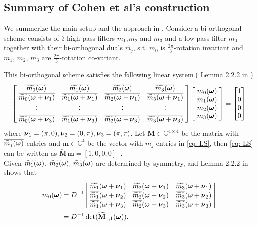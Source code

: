 \subsection{Summary of Cohen et al's construction}\label{subsec: cohen-summary}
We summerize the main setup and the approach in \cite{cohen1993compactly}. Consider a bi-orthogonal scheme consists of 3 high-pass filters $m_1,m_2$ and $m_3$ and a low-pass filter $m_0$ together with their bi-orthogonal duals $\widetilde{m_j}$, s.t.
$m_0$ is $\frac{2\pi}{3}$-rotation invariant and $m_1,\, m_2,\, m_3$ are $\frac{2\pi}{3}$-rotation co-variant.

This bi-orthogonal scheme satisfies the following linear system (
Lemma 2.2.2 in \cite{cohen1993compactly} )
\begin{align}\label{eq: LS}
\begin{bmatrix}
    \,\overline{\widetilde{m_{0}}(\boldsymbol{\omega})} & \overline{\widetilde{m_{1}}(\boldsymbol{\omega})} & \overline{\widetilde{m_{2}}(\boldsymbol{\omega})} & \overline{\widetilde{m_{3}}(\boldsymbol{\omega})}\;  \\
    \;\overline{\widetilde{m_{0}}(\boldsymbol{\omega} + \boldsymbol{\nu}_{1})} & \overline{\widetilde{m_{1}}(\boldsymbol{\omega} + \boldsymbol{\nu}_{1})}  & \overline{\widetilde{m_{2}}(\boldsymbol{\omega} + \boldsymbol{\nu}_{1})}  & \overline{\widetilde{m_{3}}(\boldsymbol{\omega} + \boldsymbol{\nu}_{1})}\; \\
    \;\vdots & \vdots & \vdots & \vdots \; \\
    \;\overline{\widetilde{m_{0}}(\boldsymbol{\omega} + \boldsymbol{\nu}_{3})} & \overline{\widetilde{m_{1}}(\boldsymbol{\omega} + \boldsymbol{\nu}_{3})} & \overline{\widetilde{m_{2}}(\boldsymbol{\omega} + \boldsymbol{\nu}_{3})} & \overline{\widetilde{m_{3}}(\boldsymbol{\omega} + \boldsymbol{\nu}_{3})}\;
\end{bmatrix}
\begin{bmatrix}
\;m_{0}(\boldsymbol{\omega})\; \\
\;m_{1}(\boldsymbol{\omega})\; \\
\;m_{2}(\boldsymbol{\omega})\; \\
\;m_{3}(\boldsymbol{\omega})\; 
\end{bmatrix} 
=
\begin{bmatrix}
1\\
0\\
0\\
0
\end{bmatrix}
\end{align}
 where $\boldsymbol{\nu}_1 = (\pi,0),\boldsymbol{\nu}_2 = (0,\pi),\boldsymbol{\nu}_3=(\pi,\pi)$.
 Let $\widetilde{\mathbf{M}}\in\mathbb{C}^{4\times 4}$ be the matrix with $\overline{\widetilde{m_{j}}(\boldsymbol{\omega})}$ entries and $\mathbf{m}\in\mathbb{C}^4$ be the vector with $m_j$ entries in \eqref{eq: LS}, then \eqref{eq: LS} can be written as \(\widetilde{\mathbf{M}}\, \mathbf{m} = [1,0,0,0]^\top\).\\
Given $\widetilde{m_{1}}(\boldsymbol{\omega})$, $\widetilde{m_{2}}(\boldsymbol{\omega}),\,\widetilde{m_{3}}(\boldsymbol{\omega})$ are determined by symmetry, and Lemma 2.2.2 in \cite{cohen1993compactly} shows that
\begin{align}\label{eq: m0-sol}
m_0(\V{\omega}) &= D^{-1}%
\left|
\begin{matrix}
    \; \sbarmn{1}{1}  & \sbarmn{2}{1}  & \sbarmn{3}{1}\; \\
    \; \sbarmn{1}{2}  & \sbarmn{2}{2}  & \sbarmn{3}{2}\; \\
    \; \sbarmn{1}{3} & \sbarmn{2}{3} & \sbarmn{3}{3}\;
\end{matrix}
\right| \notag\\
&= D^{-1}\det(\widetilde{\mathbf{M}}_{1,1}(\V{\omega})),
\end{align}
